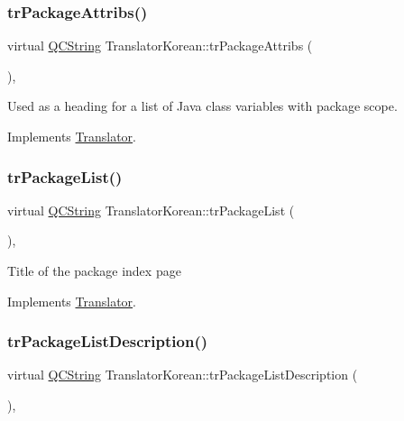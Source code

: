 \subsubsection{\texorpdfstring{trPackageAttribs()}{trPackageAttribs()}}
{\footnotesize\ttfamily virtual \mbox{\hyperlink{class_q_c_string}{Q\+C\+String}} Translator\+Korean\+::tr\+Package\+Attribs (\begin{DoxyParamCaption}{ }\end{DoxyParamCaption})\hspace{0.3cm}{\ttfamily [inline]}, {\ttfamily [virtual]}}

Used as a heading for a list of Java class variables with package scope. 

Implements \mbox{\hyperlink{class_translator}{Translator}}.

\mbox{\label{class_translator_korean_a6bfdf51711c757470c119ecc5b5e54ea}} 
\subsubsection{\texorpdfstring{trPackageList()}{trPackageList()}}
{\footnotesize\ttfamily virtual \mbox{\hyperlink{class_q_c_string}{Q\+C\+String}} Translator\+Korean\+::tr\+Package\+List (\begin{DoxyParamCaption}{ }\end{DoxyParamCaption})\hspace{0.3cm}{\ttfamily [inline]}, {\ttfamily [virtual]}}

Title of the package index page 

Implements \mbox{\hyperlink{class_translator}{Translator}}.

\mbox{\label{class_translator_korean_a7f85a138a7e0f37564094905686177f9}} 
\subsubsection{\texorpdfstring{trPackageListDescription()}{trPackageListDescription()}}
{\footnotesize\ttfamily virtual \mbox{\hyperlink{class_q_c_string}{Q\+C\+String}} Translator\+Korean\+::tr\+Package\+List\+Description (\begin{DoxyParamCaption}{ }\end{DoxyParamCaption})\hspace{0.3cm}{\ttfamily [inline]}, {\ttfamily [virtual]}}

